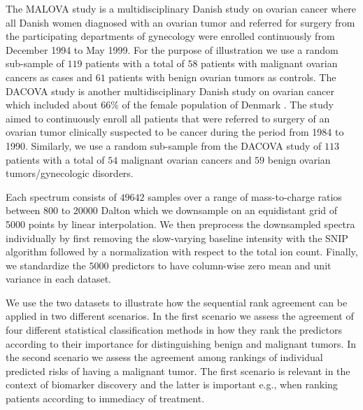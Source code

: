 \documentclass[oupdraft]{bio}
\begin{document}
The MALOVA study is a multidisciplinary Danish study on ovarian cancer
\citep{Hogdall:2004:Cancer:15160342} where all Danish women diagnosed
with an ovarian tumor and referred for surgery from the participating
departments of gynecology were enrolled continuously from December
1994 to May 1999. For the purpose of illustration we use a random
sub-sample of $119$ patients with a total of $58$ patients with
malignant ovarian cancers as cases and $61$ patients with benign
ovarian tumors as controls. The DACOVA study is another
multidisciplinary Danish study on ovarian cancer which included about
$66\%$ of the female population of Denmark
\citep{bertelsen1991protocol}. The study aimed to continuously enroll
all patients that were referred to surgery of an ovarian tumor
clinically suspected to be cancer during the period from 1984 to
1990. Similarly, we use a random sub-sample from the DACOVA study of
$113$ patients with a total of $54$ malignant ovarian cancers and $59$
benign ovarian tumors/gynecologic disorders.

Each spectrum consists of $49642$ samples over a range of mass-to-charge ratios
between $800$ to $20000$ Dalton which we downsample on an equidistant grid of
5000 points by linear interpolation. We then preprocess the downsampled
spectra individually by first removing the slow-varying baseline intensity
with the SNIP algorithm \citep{ryan1988snip} followed by a
normalization with respect to the total ion count. Finally, we standardize
the $5000$ predictors to have column-wise zero mean and unit variance in
each dataset.

We use the two datasets to illustrate how the sequential rank
agreement can be applied in two different scenarios. In the first
scenario we assess the agreement of four different statistical
classification methods in how they rank the predictors according to
their importance for distinguishing benign and malignant tumors. In
the second scenario we assess the agreement among rankings of
individual predicted risks of having a malignant tumor. The first
scenario is relevant in the context of biomarker discovery and the
latter is important e.g., when ranking patients according to immediacy of
treatment.
\end{document}
